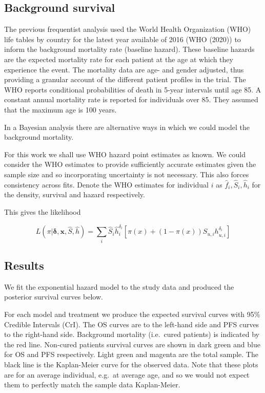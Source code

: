 \documentclass[
]{article}
\begin{document}
\hypertarget{background-survival}{%
\subsection{Background survival}\label{background-survival}}

The previous frequentist analysis used the World Health Organization
(WHO) life tables by country for the latest year available of 2016 (WHO
(2020)) to inform the background mortality rate (baseline hazard). These
baseline hazards are the expected mortality rate for each patient at the
age at which they experience the event. The mortality data are age- and
gender adjusted, thus providing a granular account of the different
patient profiles in the trial. The WHO reports conditional probabilities
of death in 5-year intervals until age 85. A constant annual mortality
rate is reported for individuals over 85. They assumed that the maximum
age is 100 years.

In a Bayesian analysis there are alternative ways in which we could
model the background mortality.

For this work we shall use WHO hazard point estimates as known. We could
consider the WHO estimates to provide sufficiently accurate estimates
given the sample size and so incorporating uncertainty is not necessary.
This also forces consistency across fits. Denote the WHO estimates for
individual \(i\) as \(\hat{f}_i, \hat{S}_i, \hat{h}_i\) for the density,
survival and hazard respectively.

This gives the likelihood

\[
L(\pi | \boldsymbol{\delta}, \boldsymbol{x}, \hat{S}, \hat{h}) =
\sum_i \hat{S}_i \hat{h}_i^{\delta_i} \left[ \pi(x) + (1 - \pi(x)) S_{u, i} h_{u , i}^{\delta_i} \right]
\]

\hypertarget{results}{%
\subsection{Results}\label{results}}

We fit the exponential hazard model to the study data and produced the
posterior survival curves below.

For each model and treatment we produce the expected survival curves
with 95\% Credible Intervals (CrI). The OS curves are to the left-hand
side and PFS curves to the right-hand side. Background mortality
(i.e.~cured patients) is indicated by the red line. Non-cured patients
survival curves are shown in dark green and blue for OS and PFS
respectively. Light green and magenta are the total sample. The black
line is the Kaplan-Meier curve for the observed data. Note that these
plots are for an average individual, e.g.~at average age, and so we
would not expect them to perfectly match the sample data Kaplan-Meier.
\end{document}
